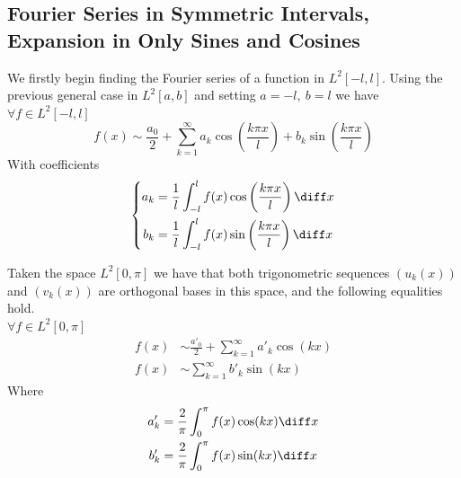 \documentclass[../mmf.tex]{subfiles}
\begin{document}
\subsection{Fourier Series in Symmetric Intervals, Expansion in Only Sines and Cosines}
\begin{dfn}
	We firstly begin finding the Fourier series of a function in $L^2[-l,l]$. Using the previous general case in $L^2[a,b]$ and setting $a=-l,\ b=l$ we have $\forall f\in L^2[-l,l]$
	\begin{equation}
		f(x)\sim\frac{a_0}{2}+\sum_{k=1}^{\infty}a_k\cos\left( \frac{k\pi x}{l} \right)+b_k\sin\left( \frac{k\pi x}{l} \right)
		\label{eq:fouserll}
	\end{equation}
	With coefficients
	\begin{equation}
		\left\{ \begin{aligned}
				a_k&=\frac{1}{l}\int_{-l}^{l}f(x)\cos\left( \frac{k\pi x}{l} \right)\diff x\\
				b_k&=\frac{1}{l}\int_{-l}^{l}f(x)\sin\left( \frac{k\pi x}{l} \right)\diff x
		\end{aligned}\right.
		\label{eq:fouserllcoef}
	\end{equation}
\end{dfn}
\begin{thm}
	Taken the space $L^2[0,\pi]$ we have that both trigonometric sequences $(u_k(x))$ and $(v_k(x))$ are orthogonal bases in this space, and the following equalities hold.\\
	$\forall f\in L^2[0,\pi]$
	\begin{equation*}
		\begin{aligned}
			f(x)&\sim\frac{a'_0}{2}+\sum_{k=1}^{\infty}a'_k\cos(kx)\\
			f(x)&\sim\sum_{k=1}^{\infty}b'_k\sin(kx)
		\end{aligned}
	\end{equation*}
	Where
	\begin{equation*}
		\begin{aligned}
			a'_k&=\frac{2}{\pi}\int_{0}^{\pi}f(x)\cos(kx)\diff x\\
			b'_k&=\frac{2}{\pi}\int_{0}^{\pi}f(x)\sin(kx)\diff x
		\end{aligned}
	\end{equation*}
\end{thm}
\end{document}
